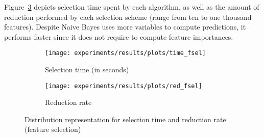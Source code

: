 \documentclass[preprint,12pt]{elsarticle}
\begin{document}
Figure~\ref{fig:fsel} depicts selection time spent by each algorithm, as well as the amount of reduction performed by each selection scheme (range from ten to one thousand features).
Despite Naive Bayes uses more variables to compute predictions, it performs faster since it does not require to compute feature importances.

\begin{figure}
\begin{subfigure}{.5\textwidth}
  \centering
  \texttt{[image: experiments/results/plots/time\_fsel]}
  \caption{Selection time (in seconds)}
  \label{fig:time-fsel}
\end{subfigure}%
\begin{subfigure}{.5\textwidth}
  \centering
  \texttt{[image: experiments/results/plots/red\_fsel]}
  \caption{Reduction rate}
  \label{fig:red-fsel}
\end{subfigure}
\caption{Distribution representation for selection time and reduction rate (feature selection)}
\label{fig:fsel}
\end{figure}
\end{document}
